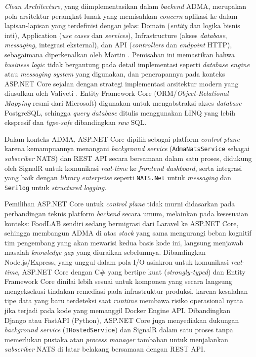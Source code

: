 \textit{Clean Architecture}, yang diimplementasikan dalam \textit{backend} ADMA, merupakan pola arsitektur perangkat lunak yang memisahkan \textit{concern} aplikasi ke dalam lapisan-lapisan yang terdefinisi dengan jelas: Domain (\textit{entity} dan logika bisnis inti), Application (\textit{use cases} dan \textit{services}), Infrastructure (akses \textit{database}, \textit{messaging}, integrasi eksternal), dan API (\textit{controllers} dan \textit{endpoint} HTTP), sebagaimana diperkenalkan oleh Martin \cite{martin2017clean}. Pemisahan ini memastikan bahwa \textit{business logic} tidak bergantung pada detail implementasi seperti \textit{database engine} atau \textit{messaging system} yang digunakan, dan penerapannya pada konteks ASP.NET Core sejalan dengan strategi implementasi arsitektur modern yang diusulkan oleh Valiveti \cite{valiveti2025evolution}. Entity Framework Core (ORM/\textit{Object-Relational Mapping} resmi dari Microsoft) digunakan untuk mengabstraksi akses \textit{database} PostgreSQL, sehingga \textit{query} \textit{database} ditulis menggunakan LINQ yang lebih ekspresif dan \textit{type-safe} dibandingkan \textit{raw} SQL.

Dalam konteks ADMA, ASP.NET Core dipilih sebagai platform \textit{control plane} karena kemampuannya menangani \textit{background service} (\texttt{AdmaNatsService} sebagai \textit{subscriber} NATS) dan REST API secara bersamaan dalam satu proses, didukung oleh SignalR untuk komunikasi \textit{real-time} ke \textit{frontend} \textit{dashboard}, serta integrasi yang baik dengan \textit{library} \textit{enterprise} seperti \texttt{NATS.Net} untuk \textit{messaging} dan \texttt{Serilog} untuk \textit{structured logging}.

Pemilihan ASP.NET Core untuk \textit{control plane} tidak murni didasarkan pada perbandingan teknis platform \textit{backend} secara umum, melainkan pada kesesuaian konteks: FoodLAB sendiri sedang bermigrasi dari Laravel ke ASP.NET Core, sehingga membangun ADMA di atas \textit{stack} yang sama mengurangi beban kognitif tim pengembang yang akan mewarisi kedua basis kode ini, langsung menjawab masalah \textit{knowledge gap} yang diuraikan sebelumnya. Dibandingkan Node.js/Express, yang unggul dalam pola I/O asinkron untuk komunikasi \textit{real-time}, ASP.NET Core dengan C\# yang bertipe kuat (\textit{strongly-typed}) dan Entity Framework Core dinilai lebih sesuai untuk komponen yang secara langsung mengeksekusi tindakan remediasi pada infrastruktur produksi, karena kesalahan tipe data yang baru terdeteksi saat \textit{runtime} membawa risiko operasional nyata jika terjadi pada kode yang memanggil Docker Engine API. Dibandingkan Django atau FastAPI (Python), ASP.NET Core juga menyediakan dukungan \textit{background service} (\texttt{IHostedService}) dan SignalR dalam satu proses tanpa memerlukan pustaka atau \textit{process manager} tambahan untuk menjalankan \textit{subscriber} NATS di latar belakang bersamaan dengan REST API.

